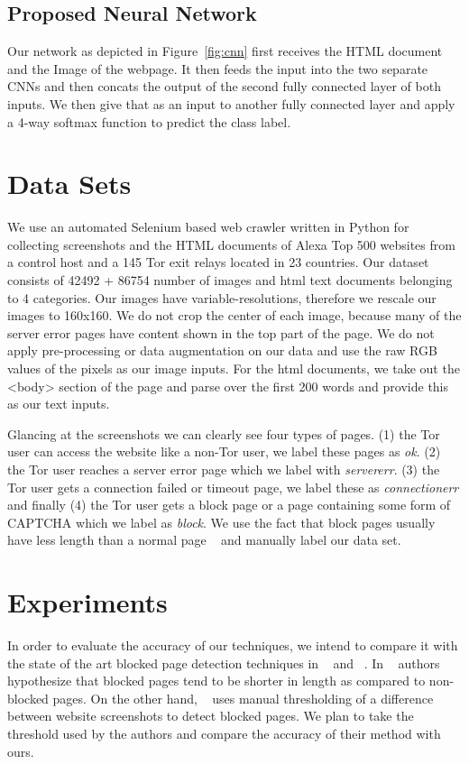 \documentclass{article} %
\begin{document}
\subsection{Proposed Neural Network}
Our network as depicted in Figure~\ref{fig:cnn} first receives the HTML document and the Image of the webpage. It then feeds the input into the two separate CNNs and then concats the output of the second fully connected layer of both inputs. We then give that as an input to another fully connected layer and apply a 4-way softmax function to predict the class label.

\section{Data Sets}
We use an automated Selenium based web crawler written in Python for collecting screenshots and the HTML documents of Alexa Top 500 websites from a control host and a 145 Tor exit relays located in 23 countries. Our dataset consists of 42492 + 86754 number of images and html text documents belonging to 4 categories. Our images have variable-resolutions, therefore we rescale our images to 160x160. We do not crop the center of each image, because many of the server error pages have content shown in the top part of the page. We do not apply pre-processing or data augmentation on our data and use the raw RGB values of the pixels as our image inputs. For the html documents, we take out the <body> section of the page and parse over the first 200 words and provide this as our text inputs.

Glancing at the screenshots we can clearly see four types of pages. (1) the Tor user can access the website like a non-Tor user, we label these pages as \textit{ok}. (2) the Tor user reaches a server error page which we label with \textit{servererr}. (3) the Tor user gets a connection failed or timeout page, we label these as \textit{connectionerr} and finally (4) the Tor user gets a block page or a page containing some form of CAPTCHA which we label as \textit{block}. We use the fact that block pages usually have less length than a normal page ~\cite{imc14_phillipa} and manually label our data set.


\section{Experiments}

In order to evaluate the accuracy of our techniques, we intend to compare it with the state of the art blocked page detection
techniques in ~\parencite{imc14_phillipa} and ~\parencite{torabuse}. In ~\parencite{imc14_phillipa} authors hypothesize that blocked pages tend
to be shorter in length as compared to non-blocked pages. On the other hand, ~\parencite{torabuse} uses manual thresholding of
a difference between website screenshots to detect blocked pages. We plan to take the threshold used by the authors 
and compare the accuracy of their method with ours.
\end{document}
